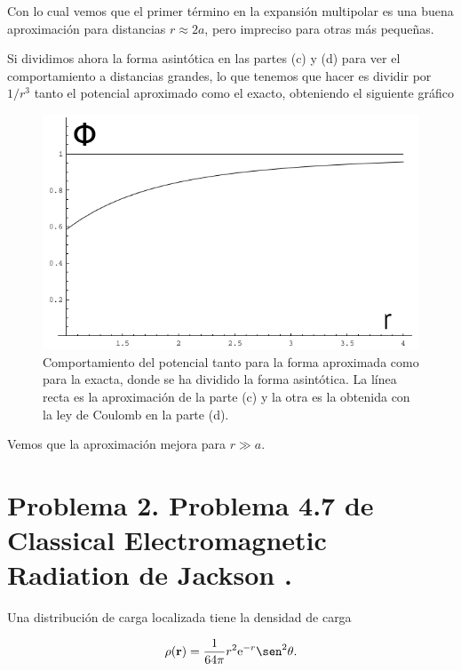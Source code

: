 \documentclass[a4paper,11pt]{article}
\numberwithin{equation}{section}
\newcommand{\euler}{\mathrm{e}}
\begin{document}
Con lo cual vemos que el primer término en la expansión multipolar es una buena 
aproximación para distancias $r \approx 2a$, pero impreciso para otras más pequeñas.

\vspace{.3cm}

Si dividimos ahora la forma asintótica en las partes (c) y (d) para ver el comportamiento 
a distancias grandes, lo que tenemos que hacer es dividir por $1/r^3$ tanto 
el potencial aproximado como el exacto, obteniendo el siguiente gráfico

\begin{figure}[H]
\center 
\includegraphics[scale=0.6]{problema1fig4}
\caption{Comportamiento del potencial tanto para la forma aproximada como para 
la exacta, donde se ha dividido la forma asintótica. La línea recta es la aproximación 
de la parte (c) y la otra es la obtenida con la ley de Coulomb en la parte (d).}
\end{figure}

Vemos que la aproximación mejora para $r \gg a$. 

\newpage

\section{Problema 2. Problema 4.7 de Classical Electromagnetic Radiation
de Jackson \cite{jackson}.}

Una distribución de carga localizada tiene la densidad de carga 

$$
\rho(\mathbf{r}) = \frac{1}{64\pi}r^2\euler^{-r}\sen^2{\theta}.
$$
\end{document}
